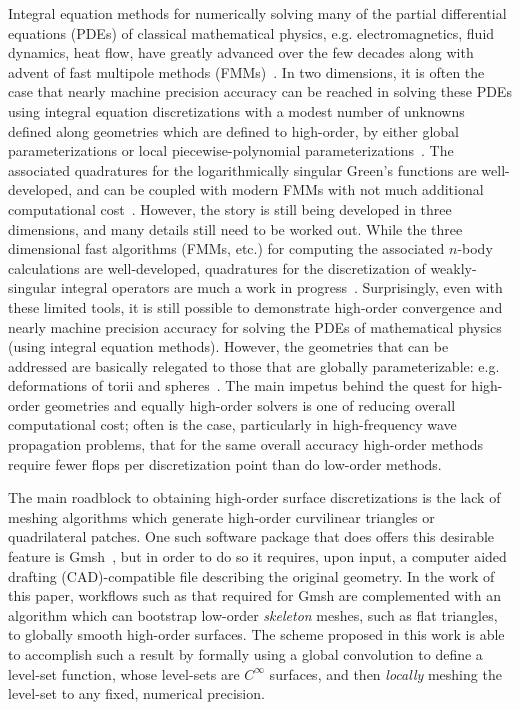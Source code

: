 \documentclass[11pt]{article}
\numberwithin{equation}{section}
\begin{document}
Integral equation methods for numerically solving many of the partial
differential equations (PDEs) of classical mathematical physics,
e.g. electromagnetics, fluid dynamics, heat flow, have greatly
advanced over the few decades along with advent of fast multipole
methods (FMMs)~\cite{song1997multilevel,coifman1993fast,tornberg-2008}. In
two dimensions, it is often the case that nearly machine precision
accuracy can be reached in solving these PDEs using integral equation
discretizations with a modest number of unknowns defined along
geometries which are defined to high-order, by either global
parameterizations or local piecewise-polynomial
parameterizations~\cite{helsing2015determination,helsing}. The
associated quadratures for the logarithmically singular Green's
functions are well-developed, and can be coupled with modern FMMs with
not much additional computational cost~\cite{hao_2014,rachh_2016}.
However, the story is still being developed in three dimensions, and
many details still need to be worked out.  While the three
dimensional fast algorithms (FMMs, etc.)  for computing the associated
$n$-body calculations are well-developed, quadratures for the
discretization of weakly-singular integral operators are much a work
in
progress~\cite{wala2018qbx,bremer-2015,bruno2001fast}. Surprisingly,
even with these limited tools, it is still possible to demonstrate
high-order convergence and nearly machine precision accuracy for solving
the PDEs of mathematical physics (using integral equation methods).
However, the geometries that can be
addressed are basically relegated to those that are globally
parameterizable: e.g. deformations of torii and
spheres~\cite{bremer-2015,oneil2018surface}.
The main impetus behind the quest for high-order
geometries and equally high-order solvers is one of reducing overall
computational cost; often is the case, particularly in high-frequency
wave propagation problems, that for the same overall accuracy
high-order methods require 
fewer flops per discretization point than do low-order methods.

The main roadblock to
obtaining high-order surface discretizations is the lack of meshing
algorithms which generate high-order curvilinear triangles or
quadrilateral patches.  One such software package that does offers this
desirable 
feature is Gmsh~\cite{gmsh}, but in order to do so it requires, upon
input, a computer aided drafting (CAD)-compatible
file describing the original geometry.  In the work of this paper, 
workflows such as that required for Gmsh are complemented
with an algorithm which can
bootstrap low-order \emph{skeleton} meshes, such as flat triangles, to
globally smooth high-order surfaces. The scheme proposed in this work
is able to accomplish such a result by formally using a global
convolution to define a level-set function, whose level-sets are
$C^\infty$ surfaces, and then \emph{locally} meshing the level-set to
any fixed, numerical precision.
\end{document}
